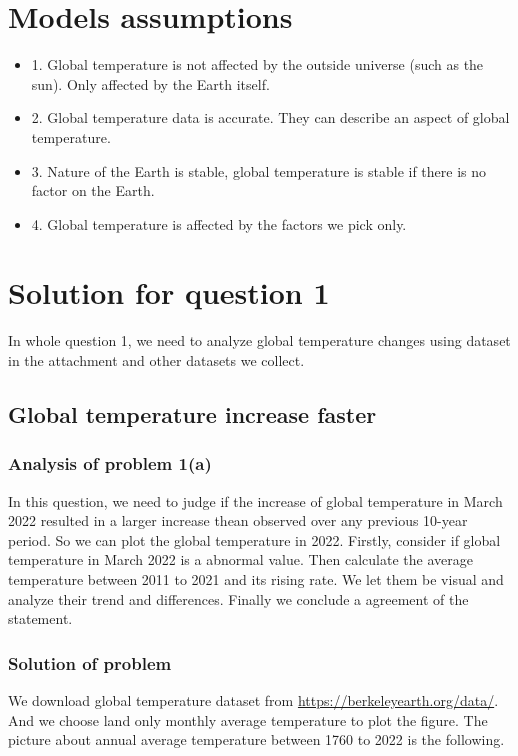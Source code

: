 \documentclass{apmcmthesis}
\begin{document}
\section{Models assumptions}
\begin{itemize}
  \item 1. Global temperature is not affected by the outside universe (such as the sun). Only affected by the Earth itself.
  \item 2. Global temperature data is accurate. They can describe an aspect of global temperature.
  \item 3. Nature of the Earth is stable, global temperature is stable if there is no factor on the Earth.
  \item 4. Global temperature is affected by the factors we pick only.
\end{itemize}

\section{Solution for question 1}
In whole question 1, we need to analyze global temperature changes using dataset in the attachment and other datasets we collect.

\subsection{Global temperature increase faster}
\subsubsection{Analysis of problem 1(a)}
In this question, we need to judge if the increase of global temperature in March 2022 resulted in a larger increase thean observed over any previous 10-year period. 
So we can plot the global temperature in 2022.
Firstly, consider if global temperature in March 2022 is a abnormal value. 
Then calculate the average temperature between 2011 to 2021 and its rising rate.
We let them be visual and analyze their trend and differences. 
Finally we conclude a agreement of the statement. 

\subsubsection{Solution of problem}
We download global temperature dataset from \url{https://berkeleyearth.org/data/}.
And we choose land only monthly average temperature to plot the figure. 
The picture about annual average temperature between 1760 to 2022 is the following.
\end{document}
